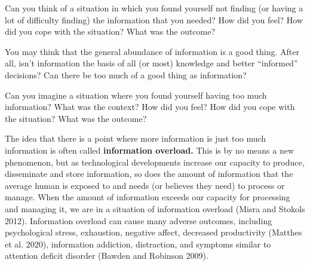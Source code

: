 \documentclass[
  letterpaper,
  DIV=11,
  numbers=noendperiod]{scrreprt}
\begin{document}
\begin{tcolorbox}[enhanced jigsaw, arc=.35mm, bottomrule=.15mm, bottomtitle=1mm, breakable, colback=white, colbacktitle=quarto-callout-tip-color!10!white, colframe=quarto-callout-tip-color-frame, coltitle=black, left=2mm, leftrule=.75mm, opacityback=0, opacitybacktitle=0.6, rightrule=.15mm, title=\textcolor{quarto-callout-tip-color}{\faLightbulb}\hspace{0.5em}{Pause and reflect}, titlerule=0mm, toprule=.15mm, toptitle=1mm]

Can you think of a situation in which you found yourself not finding (or
having a lot of difficulty finding) the information that you needed? How
did you feel? How did you cope with the situation? What was the outcome?

\end{tcolorbox}

You may think that the general abundance of information is a good thing.
After all, isn't information the basis of all (or most) knowledge and
better ``informed'' decisions? Can there be too much of a good thing as
information?

\begin{tcolorbox}[enhanced jigsaw, arc=.35mm, bottomrule=.15mm, bottomtitle=1mm, breakable, colback=white, colbacktitle=quarto-callout-tip-color!10!white, colframe=quarto-callout-tip-color-frame, coltitle=black, left=2mm, leftrule=.75mm, opacityback=0, opacitybacktitle=0.6, rightrule=.15mm, title=\textcolor{quarto-callout-tip-color}{\faLightbulb}\hspace{0.5em}{Pause and reflect}, titlerule=0mm, toprule=.15mm, toptitle=1mm]

Can you imagine a situation where you found yourself having too much
information? What was the context? How did you feel? How did you cope
with the situation? What was the outcome?

\end{tcolorbox}

The idea that there is a point where more information is just too much
information is often called \textbf{information overload.} This is by no
means a new phenomenon, but as technological developments increase our
capacity to produce, disseminate and store information, so does the
amount of information that the average human is exposed to and needs (or
believes they need) to process or manage. When the amount of information
exceeds our capacity for processing and managing it, we are in a
situation of information overload (Misra and Stokols 2012). Information
overload can cause many adverse outcomes, including psychological
stress, exhaustion, negative affect, decreased productivity (Matthes et
al. 2020), information addiction, distraction, and symptoms similar to
attention deficit disorder (Bawden and Robinson 2009).
\end{document}
